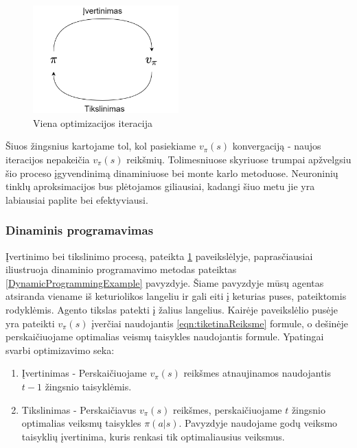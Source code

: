 \documentclass[a4paper, 12pt]{article}
\begin{document}
\begin{figure}[h]
\centering
\includegraphics[width=0.5\textwidth]{policyIteration}
\caption{Viena optimizacijos iteracija }
\label{policyIteration}
\end{figure}

Šiuos žingsnius kartojame tol, kol pasiekiame $v_{\pi}(s)$ konvergaciją - naujos iteracijos nepakeičia $v_{\pi}(s)$ reikšmių. Tolimesniuose skyriuose trumpai apžvelgsiu šio proceso įgyvendinimą dinaminiuose bei monte karlo metoduose. Neuroninių tinklų aproksimacijos bus plėtojamos giliausiai, kadangi šiuo metu jie yra labiausiai paplite bei efektyviausi.

\subsubsection{Dinaminis programavimas}

Įvertinimo bei tikslinimo procesą, pateikta \ref{policyIteration} paveikslėlyje, paprasčiausiai iliustruoja dinaminio programavimo metodas pateiktas \ref{DynamicProgrammingExample} pavyzdyje. Šiame pavyzdyje mūsų agentas atsiranda viename iš keturiolikos langeliu ir gali eiti į keturias puses, pateiktomis rodyklėmis. Agento tikslas patekti į žalius langelius. Kairėje paveikslėlio pusėje yra pateikti $v_{\pi}(s)$ įverčiai naudojantis \ref{eqn:tiketinaReiksme} formule, o dešinėje perskaičiuojame optimalias veismų taisykles naudojantis \label{eqn:greedyPolicy} formule. Ypatingai svarbi optimizavimo seka:

\begin{enumerate}
  \addtolength{\itemsep}{-0.5\baselineskip} 
  \item Įvertinimas - Perskaičiuojame $v_{\pi}(s)$ reikšmes atnaujinamos naudojantis $t-1$ žingsnio taisyklėmis.
  \item Tikslinimas - Perskaičiavus $v_{\pi}(s)$ reikšmes, perskaičiuojame $t$ žingsnio optimalias veiksmų taisykles $\pi(a|s)$. Pavyzdyje naudojame godų veiksmo taisyklių įvertinima, kuris renkasi tik optimaliausius veiksmus.
\end{enumerate}
\end{document}
